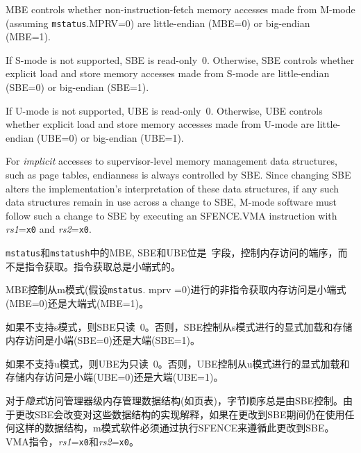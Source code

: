 MBE controls whether non-instruction-fetch memory accesses made from
M-mode (assuming {\tt mstatus}.MPRV=0) are little-endian (MBE=0) or
big-endian (MBE=1).

If S-mode is not supported, SBE is read-only~0.
Otherwise, SBE controls whether explicit load and store memory accesses made
from S-mode are little-endian (SBE=0) or big-endian (SBE=1).

If U-mode is not supported, UBE is read-only~0.
Otherwise, UBE controls whether explicit load and store memory accesses made
from U-mode are little-endian (UBE=0) or big-endian (UBE=1).

For {\em implicit} accesses to supervisor-level memory management data
structures, such as page tables, endianness is always controlled by SBE.
Since changing SBE alters the implementation's interpretation of these data
structures, if any such data structures remain in use across a change to SBE,
M-mode software must follow such a change to SBE by executing an
SFENCE.VMA instruction with {\em rs1}={\tt x0} and {\em rs2}={\tt x0}.
\fi

{\tt mstatus}和{\tt mstatush}中的MBE, SBE和UBE位是\warl\ 字段，控制内存访问的端序，而不是指令获取。指令获取总是小端式的。

MBE控制从m模式(假设{\tt mstatus}. mprv =0)进行的非指令获取内存访问是小端式(MBE=0)还是大端式(MBE=1)。

如果不支持s模式，则SBE只读~0。否则，SBE控制从s模式进行的显式加载和存储内存访问是小端(SBE=0)还是大端(SBE=1)。

如果不支持u模式，则UBE为只读~0。否则，UBE控制从u模式进行的显式加载和存储内存访问是小端(UBE=0)还是大端(UBE=1)。

对于{\em 隐式}访问管理器级内存管理数据结构(如页表)，字节顺序总是由SBE控制。由于更改SBE会改变对这些数据结构的实现解释，如果在更改到SBE期间仍在使用任何这样的数据结构，m模式软件必须通过执行SFENCE来遵循此更改到SBE。VMA指令，{\em rs1}={\tt x0}和{\em rs2}={\tt x0}。

\iffalse
\begin{commentary}
Only in contrived scenarios will a given memory-management data structure be
interpreted as both little-endian and big-endian.
In practice, SBE will only be changed at runtime on world switches, in which
case neither the old nor new memory-management data structure will be
reinterpreted in a different endianness.
In this case, no additional SFENCE.VMA is necessary, beyond what would
ordinarily be required for a world switch.
\end{commentary}
\fi

